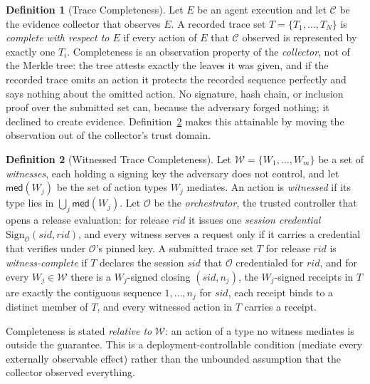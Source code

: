 \documentclass[letterpaper,10pt,twocolumn]{article}
\theoremstyle{definition}
\newtheorem{definition}{Definition}
\begin{document}
\begin{definition}[Trace Completeness]\label{def:completeness}
Let $E$ be an agent execution and let $\mathcal{C}$ be the evidence collector that observes $E$. A recorded trace set $T = \{T_1, \dots, T_N\}$ is \emph{complete with respect to $E$} if every action of $E$ that $\mathcal{C}$ observed is represented by exactly one $T_i$. Completeness is an observation property of the \emph{collector}, not of the Merkle tree: the tree attests exactly the leaves it was given, and if the recorded trace omits an action it protects the recorded sequence perfectly and says nothing about the omitted action. No signature, hash chain, or inclusion proof over the submitted set can, because the adversary forged nothing; it declined to create evidence. Definition~\ref{def:wtc} makes this attainable by moving the observation out of the collector's trust domain.
\end{definition}

\begin{definition}[Witnessed Trace Completeness]\label{def:wtc}
Let $\mathcal{W}=\{W_1,\dots,W_m\}$ be a set of \emph{witnesses}, each holding a signing key the adversary does not control, and let $\mathsf{med}(W_j)$ be the set of action types $W_j$ mediates. An action is \emph{witnessed} if its type lies in $\bigcup_j \mathsf{med}(W_j)$. Let $\mathcal{O}$ be the \emph{orchestrator}, the trusted controller that opens a release evaluation: for release $\mathit{rid}$ it issues one \emph{session credential} $\mathrm{Sign}_{\mathcal{O}}(\mathit{sid}, \mathit{rid})$, and every witness serves a request only if it carries a credential that verifies under $\mathcal{O}$'s pinned key. A submitted trace set $T$ for release $\mathit{rid}$ is \emph{witness-complete} if $T$ declares the session $\mathit{sid}$ that $\mathcal{O}$ credentialed for $\mathit{rid}$, and for every $W_j \in \mathcal{W}$ there is a $W_j$-signed closing $(\mathit{sid}, n_j)$, the $W_j$-signed receipts in $T$ are exactly the contiguous sequence $1,\dots,n_j$ for $\mathit{sid}$, each receipt binds to a distinct member of $T$, and every witnessed action in $T$ carries a receipt.

Completeness is stated \emph{relative to} $\mathcal{W}$: an action of a type no witness mediates is outside the guarantee. This is a deployment-controllable condition  (mediate every externally observable effect)  rather than the unbounded assumption that the collector observed everything.
\end{definition}
\end{document}
